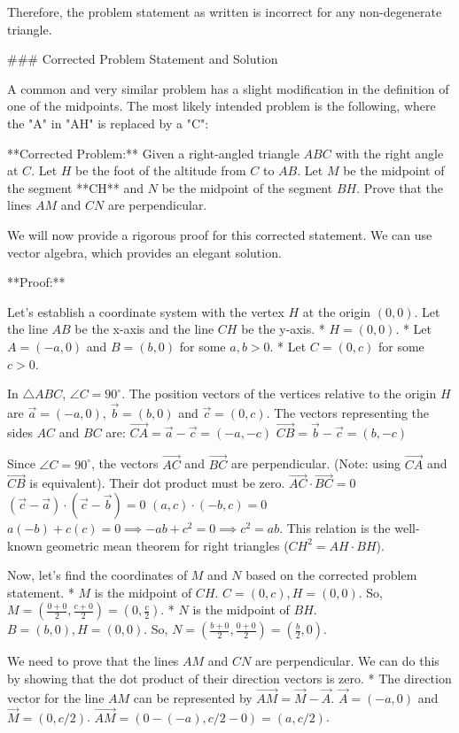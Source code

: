 Therefore, the problem statement as written is incorrect for any non-degenerate triangle.

### Corrected Problem Statement and Solution

A common and very similar problem has a slight modification in the definition of one of the midpoints. The most likely intended problem is the following, where the "A" in "AH" is replaced by a "C":

**Corrected Problem:** Given a right-angled triangle $ABC$ with the right angle at $C$. Let $H$ be the foot of the altitude from $C$ to $AB$. Let $M$ be the midpoint of the segment **CH** and $N$ be the midpoint of the segment $BH$. Prove that the lines $AM$ and $CN$ are perpendicular.

We will now provide a rigorous proof for this corrected statement. We can use vector algebra, which provides an elegant solution.

**Proof:**

Let's establish a coordinate system with the vertex $H$ at the origin $(0,0)$. Let the line $AB$ be the x-axis and the line $CH$ be the y-axis.
* $H = (0,0)$.
* Let $A = (-a, 0)$ and $B = (b, 0)$ for some $a,b > 0$.
* Let $C = (0, c)$ for some $c > 0$.

In $\triangle ABC$, $\angle C = 90^\circ$. The position vectors of the vertices relative to the origin $H$ are $\vec{a} = (-a,0)$, $\vec{b} = (b,0)$ and $\vec{c} = (0,c)$.
The vectors representing the sides $AC$ and $BC$ are:
$\vec{CA} = \vec{a} - \vec{c} = (-a, -c)$
$\vec{CB} = \vec{b} - \vec{c} = (b, -c)$

Since $\angle C = 90^\circ$, the vectors $\vec{AC}$ and $\vec{BC}$ are perpendicular. (Note: using $\vec{CA}$ and $\vec{CB}$ is equivalent). Their dot product must be zero.
$\vec{AC} \cdot \vec{BC} = 0$
$(\vec{c}-\vec{a}) \cdot (\vec{c}-\vec{b}) = 0$
$(a, c) \cdot (-b, c) = 0$
$a(-b) + c(c) = 0 \implies -ab + c^2 = 0 \implies c^2 = ab$.
This relation is the well-known geometric mean theorem for right triangles ($CH^2 = AH \cdot BH$).

Now, let's find the coordinates of $M$ and $N$ based on the corrected problem statement.
* $M$ is the midpoint of $CH$. $C=(0,c), H=(0,0)$. So, $M = \left(\frac{0+0}{2}, \frac{c+0}{2}\right) = \left(0, \frac{c}{2}\right)$.
* $N$ is the midpoint of $BH$. $B=(b,0), H=(0,0)$. So, $N = \left(\frac{b+0}{2}, \frac{0+0}{2}\right) = \left(\frac{b}{2}, 0\right)$.

We need to prove that the lines $AM$ and $CN$ are perpendicular. We can do this by showing that the dot product of their direction vectors is zero.
* The direction vector for the line $AM$ can be represented by $\vec{AM} = \vec{M} - \vec{A}$.
$\vec{A} = (-a, 0)$ and $\vec{M} = (0, c/2)$.
$\vec{AM} = (0 - (-a), c/2 - 0) = (a, c/2)$.


